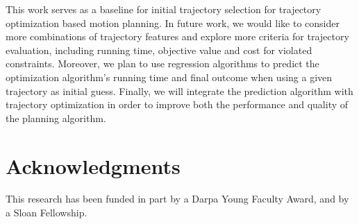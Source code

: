 \documentclass[letterpaper, 10 pt, conference]{ieeeconf}  %
\begin{document}
This work serves as a baseline for initial trajectory selection for trajectory optimization based motion planning. In future work, we would like to consider more combinations of trajectory features and explore more criteria for trajectory evaluation, including running time, objective value and cost for violated constraints. Moreover, we plan to use regression algorithms to predict the optimization algorithm's running time and final outcome when using a given trajectory as initial guess. Finally, we will integrate the prediction algorithm with trajectory optimization in order to improve both the performance and quality of the planning algorithm.


\section*{Acknowledgments}
This research has been funded in part by a Darpa Young Faculty Award, and by a Sloan Fellowship.



\end{document}
